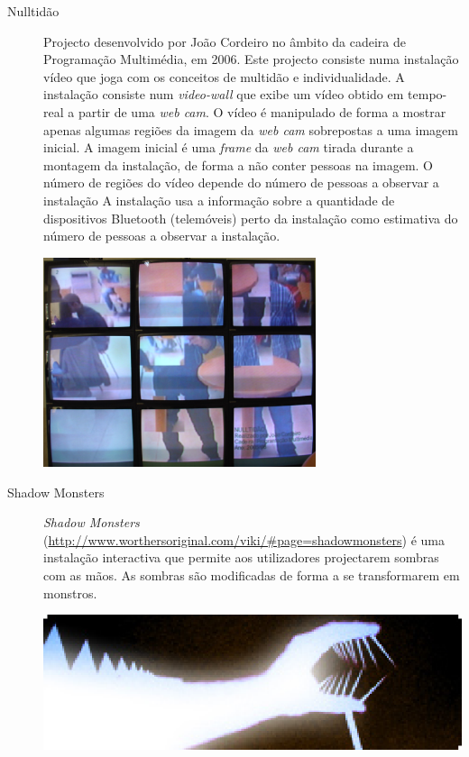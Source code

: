 \begin{description}
\item[Nulltidão] Projecto desenvolvido por João Cordeiro no âmbito da cadeira de Programação Multimédia, em 2006. 
Este projecto consiste numa instalação vídeo que joga com os conceitos de multidão e individualidade. 
A instalação consiste num \emph{video-wall} que exibe um vídeo obtido em tempo-real a partir de uma \emph{web cam}. O vídeo
é manipulado de forma a mostrar apenas algumas regiões da imagem da \emph{web cam} sobrepostas a uma imagem inicial. A imagem inicial é uma \emph{frame} da \emph{web cam} tirada durante a montagem da instalação, de forma a não conter pessoas na imagem. O número de regiões do vídeo depende do número de pessoas a observar a instalação
A instalação usa a informação sobre a quantidade de dispositivos Bluetooth (telemóveis) perto da instalação como estimativa do número de pessoas a observar a instalação. 
\begin{center}
	\includegraphics[width=8cm]{images/nulltidao.eps}
\end{center}

\item[Shadow Monsters] \emph{Shadow Monsters} (\url{http://www.worthersoriginal.com/viki/#page=shadowmonsters}) é uma instalação interactiva que permite aos utilizadores projectarem sombras com as mãos. As sombras são modificadas de forma a se transformarem em monstros. 
\begin{center}
	\includegraphics{images/shadowmonsters.eps}
\end{center}


\end{description}
